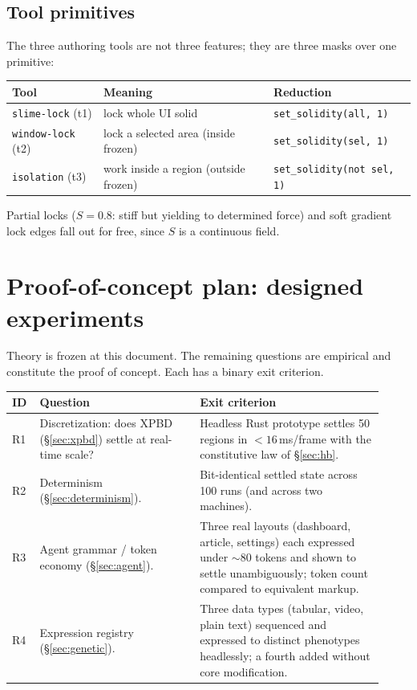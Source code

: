 \documentclass[11pt]{article}
\begin{document}
\subsection{Tool primitives}\label{sec:tools}
The three authoring tools are not three features; they are three masks over one primitive:
\begin{center}
\begin{tabular}{@{}lll@{}}
\toprule
Tool & Meaning & Reduction \\
\midrule
\texttt{slime-lock} (t1) & lock whole UI solid & \texttt{set\_solidity(all, 1)} \\
\texttt{window-lock} (t2) & lock a selected area (inside frozen) & \texttt{set\_solidity(sel, 1)} \\
\texttt{isolation} (t3) & work inside a region (outside frozen) & \texttt{set\_solidity(not sel, 1)} \\
\bottomrule
\end{tabular}
\end{center}
Partial locks ($S=0.8$: stiff but yielding to determined force) and soft gradient lock edges fall
out for free, since $S$ is a continuous field.

\section{Proof-of-concept plan: designed experiments}\label{sec:experiments}

Theory is frozen at this document. The remaining questions are empirical and constitute the
proof of concept. Each has a binary exit criterion.

\begin{center}
\begin{tabular}{@{}p{0.06\linewidth}p{0.40\linewidth}p{0.46\linewidth}@{}}
\toprule
\textbf{ID} & \textbf{Question} & \textbf{Exit criterion} \\
\midrule
R1 & Discretization: does XPBD (\S\ref{sec:xpbd}) settle at real-time scale? &
Headless Rust prototype settles 50 regions in $<16$\,ms/frame with the constitutive law of
\S\ref{sec:hb}. \\
R2 & Determinism (\S\ref{sec:determinism}). &
Bit-identical settled state across 100 runs (and across two machines). \\
R3 & Agent grammar / token economy (\S\ref{sec:agent}). &
Three real layouts (dashboard, article, settings) each expressed under $\sim$80 tokens and shown
to settle unambiguously; token count compared to equivalent markup. \\
R4 & Expression registry (\S\ref{sec:genetic}). &
Three data types (tabular, video, plain text) sequenced and expressed to distinct phenotypes
headlessly; a fourth added without core modification. \\
\bottomrule
\end{tabular}
\end{center}
\end{document}
